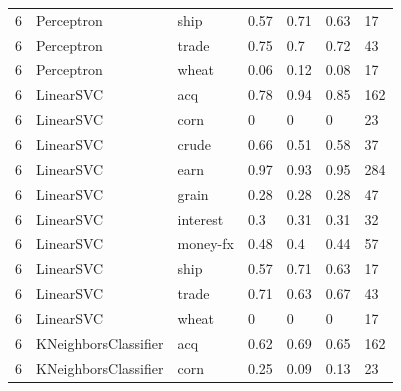 \documentclass{article}
\begin{document}
\begin{table}[h]
\begin{tabular}{lllllll}
6             & Perceptron             & ship            & 0.57               & 0.71            & 0.63              & 17               \\
6             & Perceptron             & trade           & 0.75               & 0.7             & 0.72              & 43               \\
6             & Perceptron             & wheat           & 0.06               & 0.12            & 0.08              & 17               \\
6             & LinearSVC              & acq             & 0.78               & 0.94            & 0.85              & 162              \\
6             & LinearSVC              & corn            & 0                  & 0               & 0                 & 23               \\
6             & LinearSVC              & crude           & 0.66               & 0.51            & 0.58              & 37               \\
6             & LinearSVC              & earn            & 0.97               & 0.93            & 0.95              & 284              \\
6             & LinearSVC              & grain           & 0.28               & 0.28            & 0.28              & 47               \\
6             & LinearSVC              & interest        & 0.3                & 0.31            & 0.31              & 32               \\
6             & LinearSVC              & money-fx        & 0.48               & 0.4             & 0.44              & 57               \\
6             & LinearSVC              & ship            & 0.57               & 0.71            & 0.63              & 17               \\
6             & LinearSVC              & trade           & 0.71               & 0.63            & 0.67              & 43               \\
6             & LinearSVC              & wheat           & 0                  & 0               & 0                 & 17               \\
6             & KNeighborsClassifier   & acq             & 0.62               & 0.69            & 0.65              & 162              \\
6             & KNeighborsClassifier   & corn            & 0.25               & 0.09            & 0.13              & 23               \\

\end{tabular}
\end{table}
\end{document}
